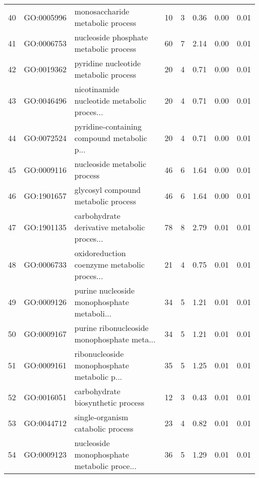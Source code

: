 \begin{table}[ht]
\begin{tabular}{rllrrrrr}
  40 & GO:0005996 & monosaccharide metabolic process &  10 &   3 & 0.36 & 0.00 & 0.01 \\ 
  41 & GO:0006753 & nucleoside phosphate metabolic process &  60 &   7 & 2.14 & 0.00 & 0.01 \\ 
  42 & GO:0019362 & pyridine nucleotide metabolic process &  20 &   4 & 0.71 & 0.00 & 0.01 \\ 
  43 & GO:0046496 & nicotinamide nucleotide metabolic proces... &  20 &   4 & 0.71 & 0.00 & 0.01 \\ 
  44 & GO:0072524 & pyridine-containing compound metabolic p... &  20 &   4 & 0.71 & 0.00 & 0.01 \\ 
  45 & GO:0009116 & nucleoside metabolic process &  46 &   6 & 1.64 & 0.00 & 0.01 \\ 
  46 & GO:1901657 & glycosyl compound metabolic process &  46 &   6 & 1.64 & 0.00 & 0.01 \\ 
  47 & GO:1901135 & carbohydrate derivative metabolic proces... &  78 &   8 & 2.79 & 0.01 & 0.01 \\ 
  48 & GO:0006733 & oxidoreduction coenzyme metabolic proces... &  21 &   4 & 0.75 & 0.01 & 0.01 \\ 
  49 & GO:0009126 & purine nucleoside monophosphate metaboli... &  34 &   5 & 1.21 & 0.01 & 0.01 \\ 
  50 & GO:0009167 & purine ribonucleoside monophosphate meta... &  34 &   5 & 1.21 & 0.01 & 0.01 \\ 
  51 & GO:0009161 & ribonucleoside monophosphate metabolic p... &  35 &   5 & 1.25 & 0.01 & 0.01 \\ 
  52 & GO:0016051 & carbohydrate biosynthetic process &  12 &   3 & 0.43 & 0.01 & 0.01 \\ 
  53 & GO:0044712 & single-organism catabolic process &  23 &   4 & 0.82 & 0.01 & 0.01 \\ 
  54 & GO:0009123 & nucleoside monophosphate metabolic proce... &  36 &   5 & 1.29 & 0.01 & 0.01 \\ 
   \hline
\end{tabular}
\end{table}
